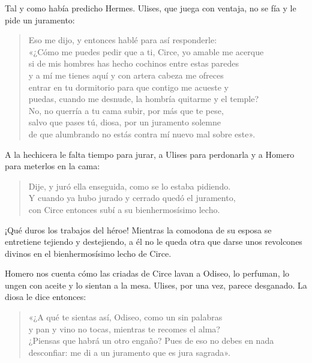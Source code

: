 Tal y como había predicho Hermes. Ulises, que juega con ventaja, no se fía y le pide un juramento:

\begin{verse}
Eso me dijo, y entonces hablé para así responderle:\\
«¿Cómo me puedes pedir que a ti, Circe, yo amable me acerque\\
si de mis hombres has hecho cochinos entre estas paredes\\
y a mí me tienes aquí y con artera cabeza me ofreces\\
entrar en tu dormitorio para que contigo me acueste y\\
puedas, cuando me desnude, la hombría quitarme y el temple?\\
No, no querría a tu cama subir, por más que te pese,\\
salvo que pases tú, diosa, por un juramento solemne\\
de que alumbrando no estás contra mí nuevo mal sobre este».
\end{verse}

A la hechicera le falta tiempo para jurar, a Ulises para perdonarla y a Homero para meterlos en la cama:

\begin{verse}
Dije, y juró ella enseguida, como se lo estaba pidiendo.\\
Y cuando ya hubo jurado y cerrado quedó el juramento,\\
con Circe entonces subí a su bienhermosísimo lecho.
\end{verse}

¡Qué duros los trabajos del héroe! Mientras la comodona de su esposa se entretiene tejiendo y destejiendo, a él no le queda otra que darse unos revolcones divinos en el bienhermosísimo lecho de Circe.

Homero nos cuenta cómo las criadas de Circe lavan a Odiseo, lo perfuman, lo ungen con aceite y lo sientan a la mesa. Ulises, por una vez, parece desganado. La diosa le dice entonces:

\begin{verse}
«¿A qué te sientas así, Odiseo, como un sin palabras\\
y pan y vino no tocas, mientras te recomes el alma?\\
¿Piensas que habrá un otro engaño? Pues de eso no debes en nada\\
desconfiar: me di a un juramento que es jura sagrada».
\end{verse}

